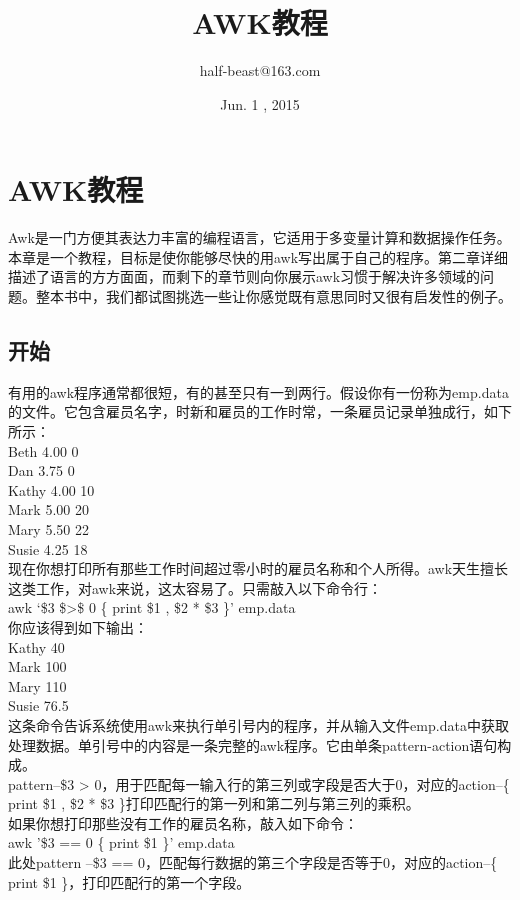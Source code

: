 \documentclass[10pt,fancyhdr,UTF-8]{ctexart}
\title{AWK教程}
\author{half-beast@163.com}
\date{Jun. 1 , 2015}
\begin{document}
\maketitle
\section{AWK教程}
\indent Awk是一门方便其表达力丰富的编程语言，它适用于多变量计算和数据操作任务。本章是一个教程，目标是使你能够尽快的用awk写出属于自己的程序。第二章详细描述了语言的方方面面，而剩下的章节则向你展示awk习惯于解决许多领域的问题。整本书中，我们都试图挑选一些让你感觉既有意思同时又很有启发性的例子。\par
\subsection{开始}
\indent 有用的awk程序通常都很短，有的甚至只有一到两行。假设你有一份称为emp.data的文件。它包含雇员名字，时新和雇员的工作时常，一条雇员记录单独成行，如下所示：\\
\indent Beth 4.00 0\\
\indent Dan  3.75 0\\
\indent Kathy 4.00 10\\
\indent Mark 5.00 20\\
\indent Mary 5.50 22\\
\indent Susie 4.25 18\\
现在你想打印所有那些工作时间超过零小时的雇员名称和个人所得。awk天生擅长这类工作，对awk来说，这太容易了。只需敲入以下命令行：\\
awk `\$3 \$>\$ 0 \{ print \$1 , \$2  *  \$3  \}' emp.data \\
你应该得到如下输出：\\
\indent Kathy   40\\
\indent Mark    100\\
\indent Mary    110\\
\indent Susie   76.5\\
\indent 这条命令告诉系统使用awk来执行单引号内的程序，并从输入文件emp.data中获取处理数据。单引号中的内容是一条完整的awk程序。它由单条pattern-action语句构成。\\
pattern--\$3 > 0，用于匹配每一输入行的第三列或字段是否大于0，对应的action--\{ print \$1 , \$2 * \$3  \}打印匹配行的第一列和第二列与第三列的乘积。\\
如果你想打印那些没有工作的雇员名称，敲入如下命令：\\
awk '\$3 == 0 \{ print \$1  \}'  emp.data \\
此处pattern --\$3 == 0，匹配每行数据的第三个字段是否等于0，对应的action--\{ print \$1  \}，打印匹配行的第一个字段。\\
\end{document}

